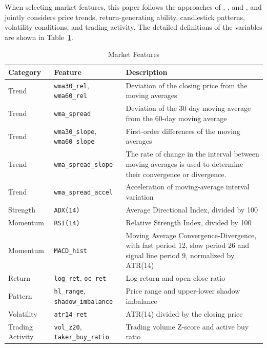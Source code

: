 \documentclass[12pt]{article}
\begin{document}
When selecting market features, this paper follows the approaches of \citet{FischerKrauss2018}, \citet{HuangWanZhangLu2024}, and \citet{AlKhatibEtAl2022}, and jointly considers price trends, return-generating ability, candlestick patterns, volatility conditions, and trading activity. The detailed definitions of the variables are shown in Table~\ref{tab:market_features}.

\begin{table}[H]
\centering
\caption{Market Features}
\label{tab:market_features}
\small
\renewcommand{\arraystretch}{1.2}
\begin{tabular}{p{}p{}p{}}
\toprule
Category & Feature & Description \\
\midrule
Trend &
\texttt{wma30\_rel}, \texttt{wma60\_rel} &
Deviation of the closing price from the moving averages \\
Trend &
\texttt{wma\_spread} &
Deviation of the 30-day moving average from the 60-day moving average \\
Trend &
\texttt{wma30\_slope}, \texttt{wma60\_slope} &
First-order differences of the moving averages \\
Trend &
\texttt{wma\_spread\_slope} &
The rate of change in the interval between moving averages is used 
to determine their convergence or divergence. \\
Trend &
\texttt{wma\_spread\_accel} &
Acceleration of moving‑average interval variation \\
Strength &
\texttt{ADX(14)} &
Average Directional Index, divided by 100 \\
Momentum &
\texttt{RSI(14)} &
Relative Strength Index, divided by 100 \\
Momentum &
\texttt{MACD\_hist} &
Moving Average Convergence‑Divergence, with fast period 12, slow period 26 and signal 
line period 9, normalized by ATR(14)\\
Return &
\texttt{log\_ret}, \texttt{oc\_ret} &
Log return and open-close ratio \\
Pattern &
\texttt{hl\_range}, \texttt{shadow\_imbalance} &
Price range and upper-lower shadow imbalance \\
Volatility &
\texttt{atr14\_ret} &
ATR(14) divided by the closing price \\
Trading Activity &
\texttt{vol\_z20}, \texttt{taker\_buy\_ratio} &
Trading volume Z-score and active buy ratio \\
\bottomrule
\end{tabular}
\end{table}
\end{document}
